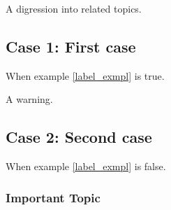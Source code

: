 \documentclass{worksheet}
\begin{document}
	\begin{digression}
	    A digression into related topics.
	\end{digression}
    
    \subsection{Case 1: First case}
    When example \ref{label_exmpl} is true.
    \begin{warning}
     A warning. 
     
     \lipsum[1-1]
    \end{warning}
    \subsection{Case 2: Second case}
    When example \ref{label_exmpl} is false.
        
        \subsubsection{Important Topic}
        \lipsum[1-1]
	
\end{document}
